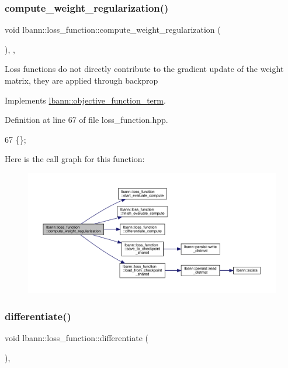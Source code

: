 \subsubsection{\texorpdfstring{compute\+\_\+weight\+\_\+regularization()}{compute\_weight\_regularization()}}
{\footnotesize\ttfamily void lbann\+::loss\+\_\+function\+::compute\+\_\+weight\+\_\+regularization (\begin{DoxyParamCaption}{ }\end{DoxyParamCaption})\hspace{0.3cm}{\ttfamily [inline]}, {\ttfamily [override]}, {\ttfamily [virtual]}}

Loss functions do not directly contribute to the gradient update of the weight matrix, they are applied through backprop 

Implements \hyperlink{classlbann_1_1objective__function__term_a134cf89caed45527bbe9d811a0b93dfc}{lbann\+::objective\+\_\+function\+\_\+term}.



Definition at line 67 of file loss\+\_\+function.\+hpp.


\begin{DoxyCode}
67 \{\};
\end{DoxyCode}
Here is the call graph for this function\+:\nopagebreak
\begin{figure}[H]
\begin{center}
\leavevmode
\includegraphics[width=350pt]{classlbann_1_1loss__function_acd6e3bdcf33235208db03ab7af88e961_cgraph}
\end{center}
\end{figure}
\mbox{\label{classlbann_1_1loss__function_adbd03ef952ee1055e3dd98f06d33324f}} 
\subsubsection{\texorpdfstring{differentiate()}{differentiate()}}
{\footnotesize\ttfamily void lbann\+::loss\+\_\+function\+::differentiate (\begin{DoxyParamCaption}{ }\end{DoxyParamCaption})\hspace{0.3cm}{\ttfamily [override]}, {\ttfamily [virtual]}}

